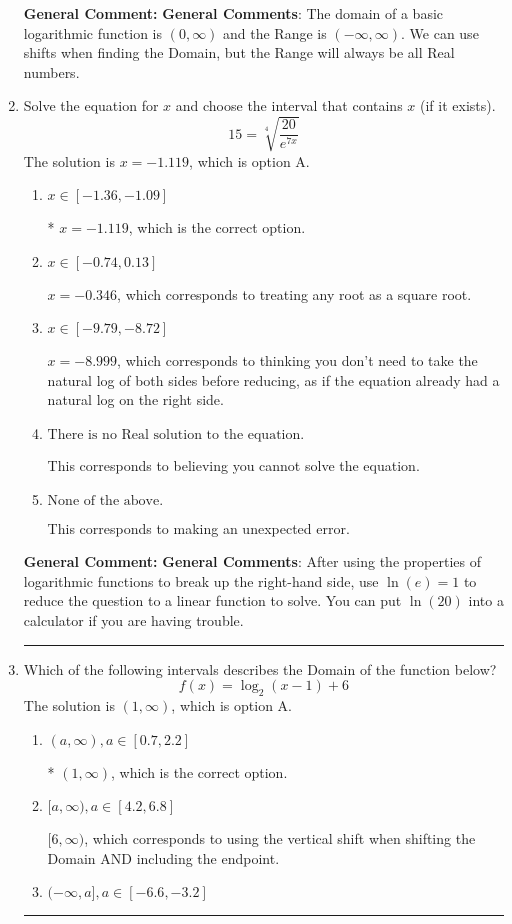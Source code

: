 \documentclass{extbook}[14pt]
\newcommand{\litem}[1]{\item #1

\rule{\textwidth}{0.4pt}}
\begin{document}
\begin{enumerate}
{\textbf{General Comment:} \textbf{General Comments}: The domain of a basic logarithmic function is $(0, \infty)$ and the Range is $(-\infty, \infty)$. We can use shifts when finding the Domain, but the Range will always be all Real numbers.
}
\litem{
 Solve the equation for $x$ and choose the interval that contains $x$ (if it exists).
\[  15 = \sqrt[4]{\frac{20}{e^{7x}}} \]
The solution is \( x = -1.119 \), which is option A.\begin{enumerate}[label=\Alph*.]
\item \( x \in [-1.36, -1.09] \)

* $x = -1.119$, which is the correct option.
\item \( x \in [-0.74, 0.13] \)

$x = -0.346$, which corresponds to treating any root as a square root.
\item \( x \in [-9.79, -8.72] \)

$x = -8.999$, which corresponds to thinking you don't need to take the natural log of both sides before reducing, as if the equation already had a natural log on the right side.
\item \( \text{There is no Real solution to the equation.} \)

This corresponds to believing you cannot solve the equation.
\item \( \text{None of the above.} \)

This corresponds to making an unexpected error.
\end{enumerate}

\textbf{General Comment:} \textbf{General Comments}: After using the properties of logarithmic functions to break up the right-hand side, use $\ln(e) = 1$ to reduce the question to a linear function to solve. You can put $\ln(20)$ into a calculator if you are having trouble.
}
\litem{
Which of the following intervals describes the Domain of the function below?
\[ f(x) = \log_2{(x-1)}+6 \]
The solution is \( (1, \infty) \), which is option A.\begin{enumerate}[label=\Alph*.]
\item \( (a, \infty), a \in [0.7, 2.2] \)

* $(1, \infty)$, which is the correct option.
\item \( [a, \infty), a \in [4.2, 6.8] \)

$[6, \infty)$, which corresponds to using the vertical shift when shifting the Domain AND including the endpoint.
\item \( (-\infty, a], a \in [-6.6, -3.2] \)


\end{enumerate}}
\end{enumerate}
\end{document}
